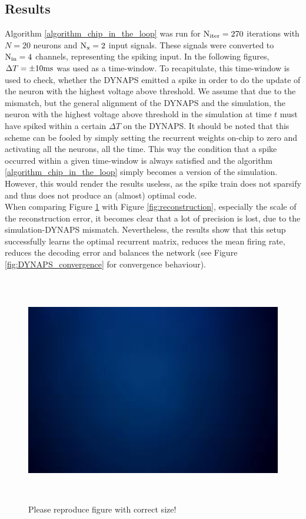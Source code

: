 \documentclass[twoside,11pt]{article}
\begin{document}
\subsection{Results}

Algorithm \ref{algorithm_chip_in_the_loop} was run for $\textnormal{N}_{\textnormal{iter}} = 270$ iterations
with $N = 20$ neurons and $\textnormal{N}_\textnormal{x} = 2$ input signals.
These signals were converted to $\textnormal{N}_{\textnormal{in}} = 4$ channels, representing the
spiking input. In the following figures, $\Delta T = \pm 10 \textnormal{ms}$ was used as a time-window.
To recapitulate, this time-window is used to check, whether the DYNAPS emitted a spike in order
to do the update of the neuron with the highest voltage above threshold. We assume that due to
the mismatch, but the general alignment of the DYNAPS and the simulation, the neuron with
the highest voltage above threshold in the simulation at time $t$ must have
spiked within a certain $\Delta T$ on the DYNAPS.
It should be noted that this scheme can be fooled by simply setting the recurrent weights on-chip
to zero and activating all the neurons, all the time. This way the condition that a spike occurred
within a given time-window is always satisfied and the algorithm \ref{algorithm_chip_in_the_loop}
simply becomes a version of the simulation. However, this would render the results useless, as
the spike train does not sparsify and thus does not produce an (almost) optimal code. \\
When comparing Figure \ref{fig:DYNAPS_reconstruction} with Figure \ref{fig:reconstruction},
especially the scale of the reconstruction error, it
becomes clear that a lot of precision is lost, due to the simulation-DYNAPS mismatch.
Nevertheless, the results show that this setup successfully learns the optimal recurrent matrix,
reduces the mean firing rate, reduces the decoding error and balances the network
(see Figure \ref{fig:DYNAPS_convergence} for convergence behaviour).


\begin{figure}[!htb]
  \centering
  \includegraphics[width = \columnwidth, height=10cm]{figures/placeholder.jpeg}
  \caption{Please reproduce figure with correct size!}
  \label{fig:DYNAPS_reconstruction}
\end{figure}
\end{document}
